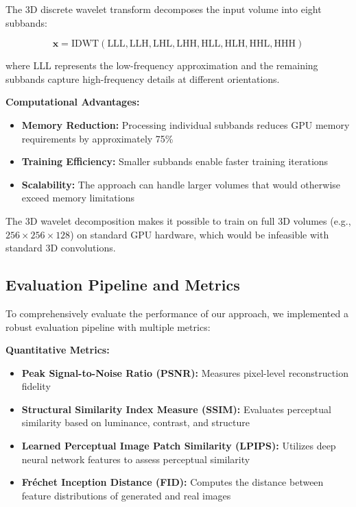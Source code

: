 \documentclass{midl} %
\begin{document}
The 3D discrete wavelet transform decomposes the input volume into eight subbands:

\begin{equation}
\mathbf{x} = \text{IDWT}(\text{LLL}, \text{LLH}, \text{LHL}, \text{LHH}, \text{HLL}, \text{HLH}, \text{HHL}, \text{HHH})
\end{equation}

where LLL represents the low-frequency approximation and the remaining subbands capture high-frequency details at different orientations.

\textbf{Computational Advantages:}
\begin{itemize}
\item \textbf{Memory Reduction:} Processing individual subbands reduces GPU memory requirements by approximately 75\%
\item \textbf{Training Efficiency:} Smaller subbands enable faster training iterations
\item \textbf{Scalability:} The approach can handle larger volumes that would otherwise exceed memory limitations
\end{itemize}

The 3D wavelet decomposition makes it possible to train on full 3D volumes (e.g., $256 \times 256 \times 128$) on standard GPU hardware, which would be infeasible with standard 3D convolutions.

\subsection{Evaluation Pipeline and Metrics}

To comprehensively evaluate the performance of our approach, we implemented a robust evaluation pipeline with multiple metrics:

\textbf{Quantitative Metrics:}
\begin{itemize}
\item \textbf{Peak Signal-to-Noise Ratio (PSNR):} Measures pixel-level reconstruction fidelity
\item \textbf{Structural Similarity Index Measure (SSIM):} Evaluates perceptual similarity based on luminance, contrast, and structure
\item \textbf{Learned Perceptual Image Patch Similarity (LPIPS):} Utilizes deep neural network features to assess perceptual similarity
\item \textbf{Fréchet Inception Distance (FID):} Computes the distance between feature distributions of generated and real images
\end{itemize}
\end{document}
